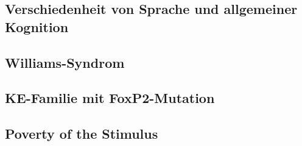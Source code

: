 \subsection{Verschiedenheit von Sprache und allgemeiner Kognition}


\subsection{Williams-Syndrom}


\subsection{KE-Familie mit FoxP2-Mutation}


\subsection{Poverty of the Stimulus}

